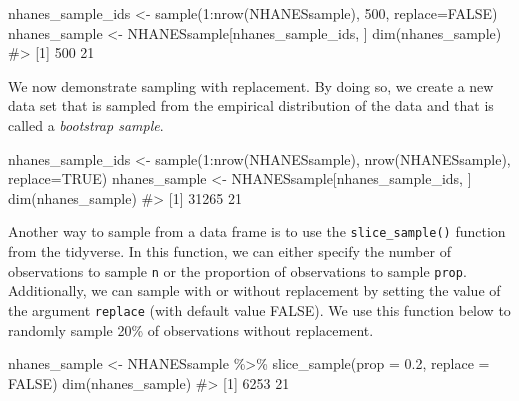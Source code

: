 \documentclass[
  letterpaper,
]{krantz}
\makeatletter
\newenvironment{Shaded}{\begin{snugshade}}{\end{snugshade}}
\newcommand{\AttributeTok}[1]{\textcolor[rgb]{0.40,0.45,0.13}{#1}}
\newcommand{\CommentTok}[1]{\textcolor[rgb]{0.37,0.37,0.37}{#1}}
\newcommand{\ConstantTok}[1]{\textcolor[rgb]{0.56,0.35,0.01}{#1}}
\newcommand{\DecValTok}[1]{\textcolor[rgb]{0.68,0.00,0.00}{#1}}
\newcommand{\FloatTok}[1]{\textcolor[rgb]{0.68,0.00,0.00}{#1}}
\newcommand{\FunctionTok}[1]{\textcolor[rgb]{0.28,0.35,0.67}{#1}}
\newcommand{\NormalTok}[1]{\textcolor[rgb]{0.00,0.23,0.31}{#1}}
\newcommand{\OtherTok}[1]{\textcolor[rgb]{0.00,0.23,0.31}{#1}}
\newcommand{\SpecialCharTok}[1]{\textcolor[rgb]{0.37,0.37,0.37}{#1}}
\newenvironment{kframe}{%
\medskip{}
\setlength{\fboxsep}{.8em}
 \def\at@end@of@kframe{}%
 \ifinner\ifhmode%
  \def\at@end@of@kframe{\end{minipage}}%
  \begin{minipage}{\columnwidth}%
 \fi\fi%
 \def\FrameCommand##1{\hskip\@totalleftmargin \hskip-\fboxsep
 \colorbox{shadecolor}{##1}\hskip-\fboxsep
     \hskip-\linewidth \hskip-\@totalleftmargin \hskip\columnwidth}%
 \MakeFramed {\advance\hsize-\width
   \@totalleftmargin\z@ \linewidth\hsize
   \@setminipage}}%
 {\par\unskip\endMakeFramed%
 \at@end@of@kframe}
\renewenvironment{Shaded}{\begin{kframe}}{\end{kframe}}
\makeatother
\begin{document}
\begin{Shaded}
\begin{Highlighting}[]
\NormalTok{nhanes\_sample\_ids }\OtherTok{\textless{}{-}} \FunctionTok{sample}\NormalTok{(}\DecValTok{1}\SpecialCharTok{:}\FunctionTok{nrow}\NormalTok{(NHANESsample), }\DecValTok{500}\NormalTok{, }\AttributeTok{replace=}\ConstantTok{FALSE}\NormalTok{)}
\NormalTok{nhanes\_sample }\OtherTok{\textless{}{-}}\NormalTok{ NHANESsample[nhanes\_sample\_ids, ]}
\FunctionTok{dim}\NormalTok{(nhanes\_sample)}
\CommentTok{\#\textgreater{} [1] 500  21}
\end{Highlighting}
\end{Shaded}

We now demonstrate sampling with replacement. By doing so, we create a
new data set that is sampled from the empirical distribution of the data
and that is called a \emph{bootstrap sample}.

\begin{Shaded}
\begin{Highlighting}[]
\NormalTok{nhanes\_sample\_ids }\OtherTok{\textless{}{-}} \FunctionTok{sample}\NormalTok{(}\DecValTok{1}\SpecialCharTok{:}\FunctionTok{nrow}\NormalTok{(NHANESsample), }\FunctionTok{nrow}\NormalTok{(NHANESsample), }\AttributeTok{replace=}\ConstantTok{TRUE}\NormalTok{)}
\NormalTok{nhanes\_sample }\OtherTok{\textless{}{-}}\NormalTok{ NHANESsample[nhanes\_sample\_ids, ]}
\FunctionTok{dim}\NormalTok{(nhanes\_sample)}
\CommentTok{\#\textgreater{} [1] 31265    21}
\end{Highlighting}
\end{Shaded}

Another way to sample from a data frame is to use the
\texttt{slice\_sample()} function from the tidyverse. In this function,
we can either specify the number of observations to sample \texttt{n} or
the proportion of observations to sample \texttt{prop}. Additionally, we
can sample with or without replacement by setting the value of the
argument \texttt{replace} (with default value FALSE). We use this
function below to randomly sample 20\% of observations without
replacement.

\begin{Shaded}
\begin{Highlighting}[]
\NormalTok{nhanes\_sample }\OtherTok{\textless{}{-}}\NormalTok{ NHANESsample }\SpecialCharTok{\%\textgreater{}\%}
  \FunctionTok{slice\_sample}\NormalTok{(}\AttributeTok{prop =} \FloatTok{0.2}\NormalTok{, }\AttributeTok{replace =} \ConstantTok{FALSE}\NormalTok{)}
\FunctionTok{dim}\NormalTok{(nhanes\_sample)}
\CommentTok{\#\textgreater{} [1] 6253   21}
\end{Highlighting}
\end{Shaded}
\end{document}
